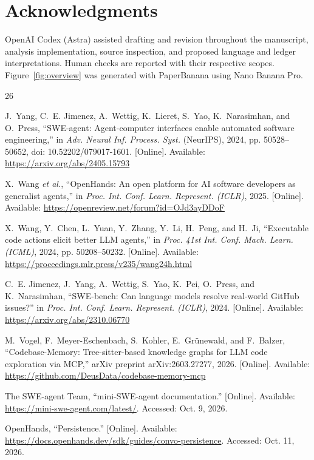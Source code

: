 \documentclass[10pt,conference]{IEEEtran}
\begin{document}
\section*{Acknowledgments}
OpenAI Codex (Astra) assisted drafting and revision throughout the manuscript, analysis implementation, source inspection, and proposed language and ledger interpretations. Human checks are reported with their respective scopes. Figure~\ref{fig:overview} was generated with PaperBanana using Nano Banana Pro.

\clearpage
\begin{thebibliography}{26}

J.~Yang, C.~E. Jimenez, A.~Wettig, K.~Lieret, S.~Yao, K.~Narasimhan, and O.~Press, ``SWE-agent: Agent-computer interfaces enable automated software engineering,'' in \emph{Adv. Neural Inf. Process. Syst.} (NeurIPS), 2024, pp. 50528--50652, doi: 10.52202/079017-1601. [Online]. Available: \url{https://arxiv.org/abs/2405.15793}

X.~Wang \emph{et al.}, ``OpenHands: An open platform for AI software developers as generalist agents,'' in \emph{Proc. Int. Conf. Learn. Represent. (ICLR)}, 2025. [Online]. Available: \url{https://openreview.net/forum?id=OJd3ayDDoF}

X.~Wang, Y.~Chen, L.~Yuan, Y.~Zhang, Y.~Li, H.~Peng, and H.~Ji, ``Executable code actions elicit better LLM agents,'' in \emph{Proc. 41st Int. Conf. Mach. Learn. (ICML)}, 2024, pp. 50208--50232. [Online]. Available: \url{https://proceedings.mlr.press/v235/wang24h.html}

C.~E. Jimenez, J.~Yang, A.~Wettig, S.~Yao, K.~Pei, O.~Press, and K.~Narasimhan, ``SWE-bench: Can language models resolve real-world GitHub issues?'' in \emph{Proc. Int. Conf. Learn. Represent. (ICLR)}, 2024. [Online]. Available: \url{https://arxiv.org/abs/2310.06770}

M.~Vogel, F.~Meyer-Eschenbach, S.~Kohler, E.~Gr\"unewald, and F.~Balzer, ``Codebase-Memory: Tree-sitter-based knowledge graphs for LLM code exploration via MCP,'' arXiv preprint arXiv:2603.27277, 2026. [Online]. Available: \url{https://github.com/DeusData/codebase-memory-mcp}

The SWE-agent Team, ``mini-SWE-agent documentation.'' [Online]. Available: \url{https://mini-swe-agent.com/latest/}. Accessed: Oct. 9, 2026.

OpenHands, ``Persistence.'' [Online]. Available: \url{https://docs.openhands.dev/sdk/guides/convo-persistence}. Accessed: Oct. 11, 2026.


\end{thebibliography}
\end{document}
